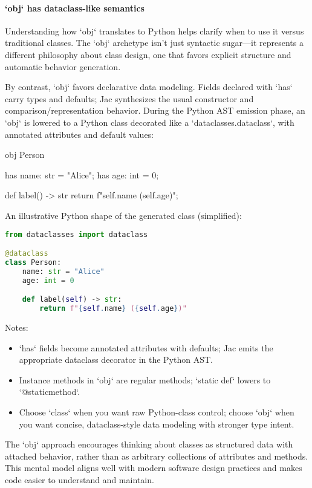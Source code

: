 \paragraph{`obj` has dataclass-like semantics}

Understanding how `obj` translates to Python helps clarify when to use it versus traditional classes. The `obj` archetype isn't just syntactic sugar—it represents a different philosophy about class design, one that favors explicit structure and automatic behavior generation.

By contrast, `obj` favors declarative data modeling. Fields declared with `has` carry types and defaults; Jac synthesizes the usual constructor and comparison/representation behavior. During the Python AST emission phase, an `obj` is lowered to a Python class decorated like a `dataclasses.dataclass`, with annotated attributes and default values:

\begin{jacblock}
obj Person {
    has name: str = "Alice";
    has age: int = 0;

    def label() -> str { return f"{self.name} ({self.age})"; }
}
\end{jacblock}

An illustrative Python shape of the generated class (simplified):

\begin{lstlisting}[language=Python]
from dataclasses import dataclass

@dataclass
class Person:
    name: str = "Alice"
    age: int = 0

    def label(self) -> str:
        return f"{self.name} ({self.age})"
\end{lstlisting}

Notes:
\begin{itemize}
    \item `has` fields become annotated attributes with defaults; Jac emits the appropriate dataclass decorator in the Python AST.
    \item Instance methods in `obj` are regular methods; `static def` lowers to `@staticmethod`.
    \item Choose `class` when you want raw Python-class control; choose `obj` when you want concise, dataclass-style data modeling with stronger type intent.
\end{itemize}

The `obj` approach encourages thinking about classes as structured data with attached behavior, rather than as arbitrary collections of attributes and methods. This mental model aligns well with modern software design practices and makes code easier to understand and maintain.

